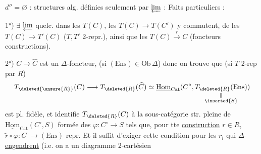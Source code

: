 $d''=\varnothing$ : structures alg. définies seulement par $\varprojlim$ : Faits particuliers :

1°) $\exists$ $\varprojlim$ quelc. dans les $T(C)$, les $T(C)\longrightarrow T(C')$ y commutent, de  les $T(C)\longrightarrow T'(C)$ ($T,T'$ 2-repr.), ainsi que les $T(C)\xrightarrow{r}C$ (foncteurs constructions).

2°) $C\longrightarrow\widehat C$ est un $\Delta$-foncteur,  (si $(\mathrm{Ens})\in\mathrm{Ob}\,\Delta$) donc on trouve que (si $T$ 2-rep par $R$)
\[
T_{\deleted{\unsure{R}}}(C)\longrightarrow T_{\deleted{R}}(\widehat C)
\simeq\underline{\mathrm{Hom}}_{\mathrm{Cat}}(C^{\circ},\underset{\substack{\Vert\\\inserted{S}}}{T_{\deleted{R}}(\mathrm{Ens})})
\]
est pl. fidèle, et identifie $T_{\deleted{R}}(C)$ à la sous-catégorie str. pleine de $\underline{\mathrm{Hom}}_{\mathrm{Cat}}(C^{\circ},S)$ formée des $\varphi:C^{\circ}\longrightarrow S$ tels que, pour tte \uline{construction} $r\in R$,  $\widetilde r\circ\varphi:C^{\circ}\longrightarrow(\mathrm{Ens})$  repr. Et il suffit d'exiger cette condition pour les $r_i$ qui $\Delta$-\uline{engendrent} (i.e. on a un diagramme 2-cartésien
